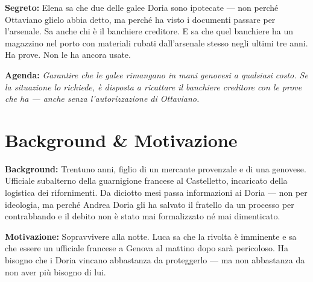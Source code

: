 \clearpage

\begin{secretbox}
  \textbf{Segreto:} Elena sa che due delle galee Doria sono ipotecate --- non
  perché Ottaviano glielo abbia detto, ma perché ha visto i documenti passare
  per l'arsenale. Sa anche chi è il banchiere creditore. E sa che quel banchiere
  ha un magazzino nel porto con materiali rubati dall'arsenale stesso negli
  ultimi tre anni. Ha prove. Non le ha ancora usate.

  \medskip\noindent\textcolor{SecretRed}{\textbf{Agenda:}}
  \textit{Garantire che le galee rimangano in mani genovesi a qualsiasi costo.
  Se la situazione lo richiede, è disposta a ricattare il banchiere creditore
  con le prove che ha — anche senza l'autorizzazione di Ottaviano.}
\end{secretbox}

\clearpage



\section*{Background \& Motivazione}

\begin{rulebox}{}
  \textbf{Background:} Trentuno anni, figlio di un mercante provenzale e di
  una genovese. Ufficiale subalterno della guarnigione francese al Castelletto,
  incaricato della logistica dei rifornimenti. Da diciotto mesi passa
  informazioni ai Doria — non per ideologia, ma perché Andrea Doria gli ha
  salvato il fratello da un processo per contrabbando e il debito non è stato
  mai formalizzato né mai dimenticato.

  \medskip\noindent\textcolor{DoriaBlue}{\textbf{Motivazione:}} Sopravvivere
  alla notte. Luca sa che la rivolta è imminente e sa che essere un ufficiale
  francese a Genova al mattino dopo sarà pericoloso. Ha bisogno che i Doria
  vincano abbastanza da proteggerlo — ma non abbastanza da non aver più bisogno
  di lui.
\end{rulebox}


